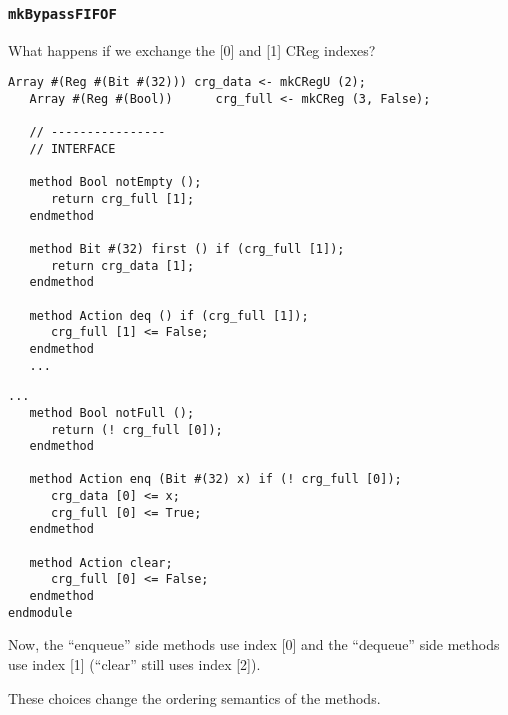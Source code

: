 \begin{frame}[fragile]
\frametitle{{\tt mkBypassFIFOF}}

\label{mkBypassFIFOF}

\footnotesize

What happens if we exchange the [0] and [1] CReg indexes?

\begin{center}
\begin{minipage}[t]{0.485\textwidth}\scriptsize
\begin{Verbatim}[frame=single]
   Array #(Reg #(Bit #(32))) crg_data <- mkCRegU (2);
   Array #(Reg #(Bool))      crg_full <- mkCReg (3, False);

   // ----------------
   // INTERFACE

   method Bool notEmpty ();
      return crg_full [1];
   endmethod

   method Bit #(32) first () if (crg_full [1]);
      return crg_data [1];
   endmethod

   method Action deq () if (crg_full [1]);
      crg_full [1] <= False;
   endmethod
   ...
\end{Verbatim}
\end{minipage}
\begin{minipage}[t]{0.485\textwidth}\scriptsize
\begin{Verbatim}[frame=single]
   ...
   method Bool notFull ();
      return (! crg_full [0]);
   endmethod

   method Action enq (Bit #(32) x) if (! crg_full [0]);
      crg_data [0] <= x;
      crg_full [0] <= True;
   endmethod

   method Action clear;
      crg_full [0] <= False;
   endmethod
endmodule
\end{Verbatim}

\vspace{1ex}

Now, the ``enqueue'' side methods use index [0] and the ``dequeue''
side methods use index [1] (``clear'' still uses index [2]).

\vspace{1ex}

These choices change the ordering semantics of the methods.

\end{minipage}
\end{center}

\end{frame}


